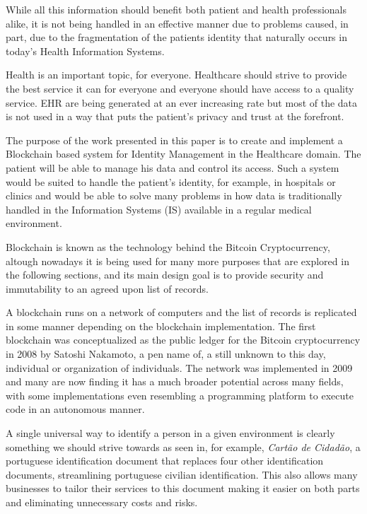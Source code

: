 \documentclass[]{llncs}
\begin{document}
While all this information should benefit both patient and health professionals alike, it is not being handled in an 
effective manner due to problems caused, in part, due to the fragmentation of the patients identity that 
naturally occurs in today's Health Information Systems.

Health is an important topic, for everyone. Healthcare should strive to provide the best service it can for everyone 
and everyone should have access to a quality service. EHR are being generated at an ever increasing rate but most of 
the data is not used in a way that puts the patient's privacy and trust at the forefront.

The purpose of the work presented in this paper is to create and implement a Blockchain based system for Identity Management 
in the Healthcare domain. The patient will be able to manage his data and control its access. Such a system would be suited 
to handle the patient’s identity, for example, in hospitals or clinics and would be able to solve many problems in how data 
is traditionally handled in the Information Systems (IS) available in a regular medical environment.

Blockchain is known as the technology behind the Bitcoin Cryptocurrency, altough nowadays it is being used for many more 
purposes that are explored in the following sections, and its main design goal is to provide security and immutability to 
an agreed upon list of records.

A blockchain runs on a network of computers and the list of records is replicated in some manner depending on the blockchain 
implementation. The first blockchain was conceptualized as the public ledger for the Bitcoin cryptocurrency in 2008 by 
Satoshi Nakamoto, a pen name of, a still unknown to this day, individual or organization of individuals. 
The network was implemented in 2009 and many are now finding it has a much broader potential across many fields, 
with some implementations even resembling a programming platform to execute code in an autonomous manner.
\cite{Nakamoto2008}

A single universal way to identify a person in a given environment is clearly something we should strive towards as seen in, 
for example, \textit{Cartão de Cidadão}, a portuguese identification document that replaces four other identification documents, 
streamlining portuguese civilian identification. 
This also allows many businesses to tailor their services to this document making it easier on both parts and eliminating 
unnecessary costs and risks.
\end{document}
